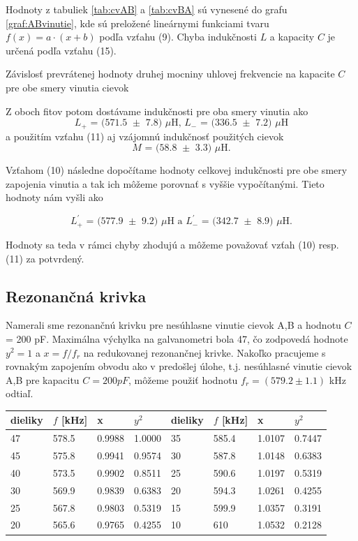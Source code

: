 \documentclass{article}
\begin{document}
Hodnoty z tabuliek \ref{tab:cvAB} a \ref{tab:cvBA} sú vynesené do grafu \ref{graf:ABvinutie}, kde sú preložené lineárnymi funkciami tvaru $f(x) = a{\cdot}(x+b)$ podľa vzťahu (9). Chyba indukčnosti $L$ a kapacity $C$ je určená podľa vzťahu (15).

\begin{graph}[H]
		\centering
		
		\caption{Závislosť prevrátenej hodnoty druhej mocniny uhlovej frekvencie na kapacite $C$ pre obe smery vinutia cievok}
		\label{graf:ABvinutie}
\end{graph}

Z oboch fitov potom dostávame indukčnosti pre oba smery vinutia ako
$$ \text{$L_+$ = (571.5 $\pm$ 7.8) $\mu$H, $L_-$ = (336.5 $\pm$ 7.2) $\mu$H}$$
a použitím vzťahu (11) aj vzájomnú indukčnosť použitých cievok
$$\text{$M$ = (58.8 $\pm$ 3.3) 
$\mu$H}. $$

Vzťahom (10) následne dopočítame hodnoty celkovej indukčnosti pre obe smery zapojenia vinutia a tak ich môžeme porovnať s vyššie vypočítanými. Tieto hodnoty nám vyšli ako

$$\text{$L^{'}_+$ = (577.9 $\pm$ 9.2) $\mu$H a $L^{'}_-$ = (342.7 $\pm$ 8.9) $\mu$H.} $$

Hodnoty sa teda v rámci chyby zhodujú a môžeme považovať vzťah (10) resp. (11) za potvrdený.


\newpage
\subsection{Rezonančná krivka}
Namerali sme rezonančnú krivku pre nesúhlasne vinutie cievok A,B a hodnotu $C$ = 200 pF. Maximálna výchylka na galvanometri bola 47, čo zodpovedá hodnote $y^2 = 1$ a $x = f/f_r$ na redukovanej rezonančnej krivke. Nakoľko pracujeme s rovnakým zapojením obvodu ako v predošlej úlohe, t.j. nesúhlasné vinutie cievok A,B pre kapacitu $C=200 pF$, môžeme použiť hodnotu $f_r = (579.2 \pm 1.1)$ kHz odtiaľ.

\begin{table}[!htbp]
\centering
\begin{tabular}{|l|l|l|l|l|l|l|l|}
\hline
dieliky & $f$ [kHz] & x & $y^2$ & dieliky & $f$ [kHz] & x & $y^2$ \\ \hline
47 & 578.5 & 0.9988 & 1.0000 & 35 & 585.4 & 1.0107 & 0.7447 \\  \hline
45 & 575.8 & 0.9941 & 0.9574 & 30 & 587.8 & 1.0148 & 0.6383 \\  \hline
40 & 573.5 & 0.9902 & 0.8511 & 25 & 590.6 & 1.0197 & 0.5319 \\  \hline
30 & 569.9 & 0.9839 & 0.6383 & 20 & 594.3 & 1.0261 & 0.4255 \\  \hline
25 & 567.8 & 0.9803 & 0.5319 & 15 & 599.9 & 1.0357 & 0.3191 \\  \hline
20 & 565.6 & 0.9765 & 0.4255 & 10 & 610   & 1.0532 & 0.2128 \\ \hline
\end{tabular}
\end{table}
\end{document}

